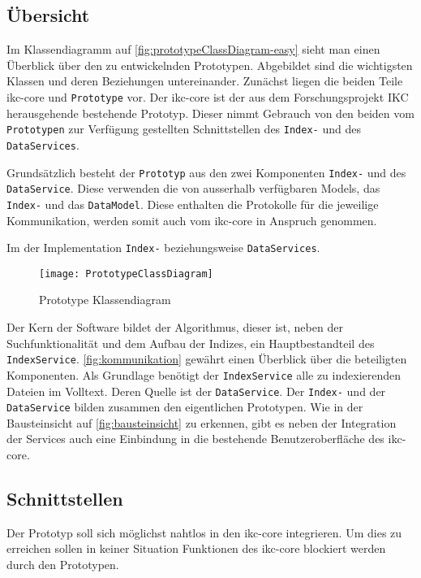 \subsection{Übersicht}


Im Klassendiagramm auf \autoref{fig:prototypeClassDiagram-easy} sieht man einen Überblick über den zu entwickelnden Prototypen. Abgebildet sind die wichtigsten Klassen und deren Beziehungen untereinander. Zunächst liegen die beiden Teile \gls{ikc-core} und \texttt{Prototype} vor. Der \gls{ikc-core} ist der aus dem Forschungsprojekt \gls{IKC} herausgehende bestehende Prototyp. Dieser nimmt Gebrauch von den beiden vom \texttt{Prototypen} zur Verfügung gestellten Schnittstellen des \texttt{Index-} und des \texttt{DataServices}.

Grundsätzlich besteht der \texttt{Prototyp} aus den zwei Komponenten \texttt{Index-} und des \texttt{DataService}. Diese verwenden die von ausserhalb ver\-füg\-bar\-en Models, das \texttt{In\-dex-} und das \texttt{DataModel}. Diese enthalten die Protokolle für die jeweilige Kommunikation, werden somit auch vom \gls{ikc-core} in Anspruch genommen.

Im der Implementation \texttt{Index-} beziehungsweise \texttt{DataServices}.

    \begin{figure}[H]
    \centering
    \texttt{[image: PrototypeClassDiagram]}
    \caption{Prototype Klassendiagram}
    \label{fig:prototypeClassDiagram-easy}
    \end{figure}

Der Kern der Software bildet der Algorithmus, dieser ist, neben der Suchfunktionalität und dem Aufbau der Indizes, ein Hauptbestandteil des \texttt{IndexService}. \autoref{fig:kommunikation} gewährt einen Überblick über die beteiligten Komponenten. Als Grundlage benötigt der \texttt{In\-dex\-Ser\-vice} alle zu indexierenden Dateien im Volltext. Deren Quelle ist der \texttt{Data\-Ser\-vice}. Der \texttt{Index-} und der \texttt{DataService} bilden zusammen den eigentlichen Prototypen. Wie in der Bausteinsicht auf \autoref{fig:bausteinsicht} zu erkennen, gibt es neben der Integration der Services auch eine Einbindung in die bestehende Benutzeroberfläche des \gls{ikc-core}.


\subsection{Schnittstellen}
Der Prototyp soll sich möglichst nahtlos in den \gls{ikc-core} integrieren. Um dies zu erreichen sollen in keiner Situation Funktionen des \gls{ikc-core} blockiert werden durch den Prototypen. 

